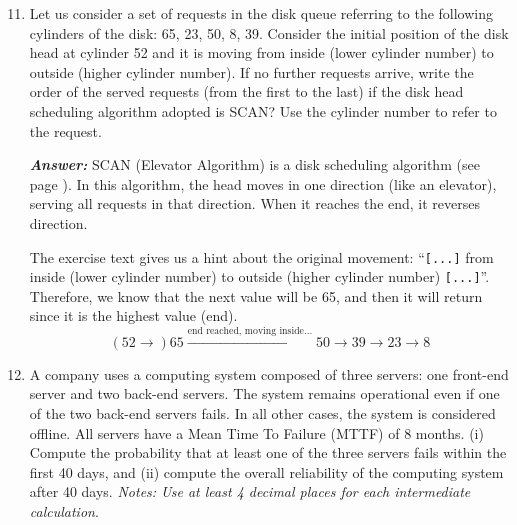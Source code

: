 \begin{enumerate}
    \setcounter{enumi}{10}
    \item Let us consider a set of requests in the disk queue referring to the following cylinders of the disk: 65, 23, 50, 8, 39. Consider the initial position of the disk head at cylinder 52 and it is moving from inside (lower cylinder number) to outside (higher cylinder number). If no further requests arrive, write the order of the served requests (from the ﬁrst to the last) if the disk head scheduling algorithm adopted is SCAN? Use the cylinder number to refer to the request.

    \emph{\textcolor{Green3}{\textbf{Answer:}}} SCAN (Elevator Algorithm) is a disk scheduling algorithm (see page \pageref{def: SCAN - Elevator Algorithm}). In this algorithm, the head moves in one direction (like an elevator), serving all requests in that direction. When it reaches the end, it reverses direction.

    The exercise text gives us a hint about the original movement: ``\texttt{[...]} from inside (lower cylinder number) to outside (higher cylinder number) \texttt{[...]}''. Therefore, we know that the next value will be 65, and then it will return since it is the highest value (end).
    \begin{equation*}
        \left(52 \to\right) 65 \xrightarrow{\text{end reached, moving inside...}} 50 \to 39 \to 23 \to 8
    \end{equation*}


    \item A company uses a computing system composed of three servers: one front-end server and two back-end servers. The system remains operational even if one of the two back-end servers fails. In all other cases, the system is considered offline. All servers have a Mean Time To Failure (MTTF) of 8 months. (i) Compute the probability that at least one of the three servers fails within the first 40 days, and (ii) compute the overall reliability of the computing system after 40 days. \emph{Notes: Use at least 4 decimal places for each intermediate calculation}.
    

\end{enumerate}
